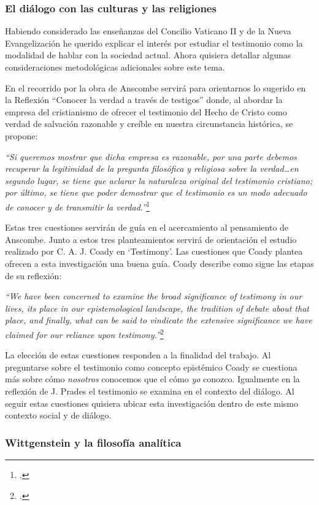 \documentclass[11pt]{article}
\begin{document}
\subsubsection{El diálogo con las culturas y las religiones}
Habiendo considerado las enseñanzas del Concilio Vaticano II y de la Nueva Evangelización he querido explicar el interés por estudiar el testimonio como la modalidad de hablar con la sociedad actual. Ahora quisiera detallar algunas consideraciones metodológicas adicionales sobre este tema.

En el recorrido por la obra de Anscombe servirá para orientarnos lo sugerido en la Reflexión ``Conocer la verdad a través de testigos'' donde, al abordar la empresa del cristianismo de ofrecer el testimonio del Hecho de Cristo como verdad de salvación razonable y creíble en nuestra circunstancia histórica, se propone:

\emph{
``Si queremos mostrar que dicha empresa es razonable, por una parte debemos recuperar la legitimidad de la pregunta filosófica y religiosa sobre la verdad\ldots en segundo lugar, se tiene que aclarar la naturaleza original del testimonio cristiano; por último, se tiene que poder demostrar que el testimonio es un modo adecuado de conocer y de transmitir la verdad.''}\footcite[267]{pradesmulticr}

Estas tres cuestiones servirán de guía en el acercamiento al pensamiento de Anscombe. Junto a estos tres planteamientos servirá de orientación el estudio realizado por C. A. J. Coady en `Testimony'. Las cuestiones que Coady plantea ofrecen a esta investigación una buena guía. Coady describe como sigue las etapas de su reflexión:

\emph{``We have been concerned to examine the broad significance of testimony in our lives, its place in our epistemological landscape, the tradition of debate about that place, and finally, what can be said to vindicate the extensive significance we have claimed for our reliance upon testimony.''}\footcite[175]{testcoady}

La elección de estas cuestiones responden a la finalidad del trabajo. Al preguntarse sobre el testimonio como concepto epistémico Coady se cuestiona más sobre cómo \emph{nosotros} conocemos que el cómo \emph{yo} conozco. Igualmente en la reflexión de J. Prades el testimonio se examina en el contexto del diálogo. Al seguir estas cuestiones quisiera ubicar esta investigación dentro de este mismo contexto social y de diálogo.

\subsubsection{Wittgenstein y la filosofía analítica}
\end{document}

